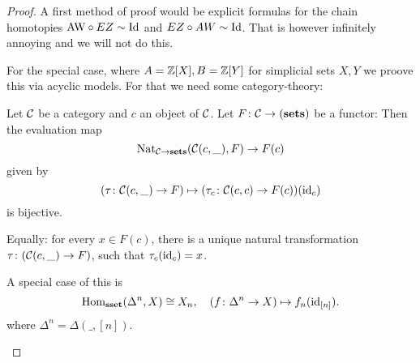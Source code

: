\documentclass[language=english]{TemplateLecture}
\begin{document}
\begin{proof}
    A first method of proof would be explicit formulas for the chain homotopies \(\text{AW} \circ EZ \sim \operatorname{Id}\) and \(EZ \circ AW \sim \operatorname{Id}\). That is however infinitely annoying and we will not do this.

    For the special case, where \(A = \mathbb{Z}[X], B= \mathbb{Z}[Y]\) for simplicial sets \(X,Y\) we proove this via acyclic models. For that we need some category-theory:

    \begin{proposition}
        Let \(\mathcal{C}\) be a category and \(c\) an object of \(\mathcal{C}\). Let \(F\colon \mathcal{C} \to (\mathbf{sets})\) be a functor: Then the evaluation map
        \[\mathrm{Nat}_{\mathcal{C} \to \mathbf{sets}}(\mathcal{C}(c,\_), F) \to F(c)\]
        given by
        \[(\tau\colon \mathcal{C}(c,\_) \to F) \mapsto (\tau_c\colon \mathcal{C}(c,c)\to F(c))(\operatorname{id}_c)\]
        is bijective.

        Equally: for every \(x \in F(c)\), there is a unique natural transformation \(\tau\colon (\mathcal{C}(c, \_) \to F)\), such that \(\tau_c(\operatorname{id}_c) = x\).
    \end{proposition}

    \begin{Remark}
        A special case of this is
        \[\operatorname{Hom}_{\mathbf{sset}}(\Delta^n, X) \cong X_n, \quad (f\colon \Delta
        ^n\to X) \mapsto f_n(\operatorname{id}_{[n]}).\]
        where \(\Delta^n = \Delta(\_, [n])\).
    \end{Remark}


\end{proof}
\end{document}

